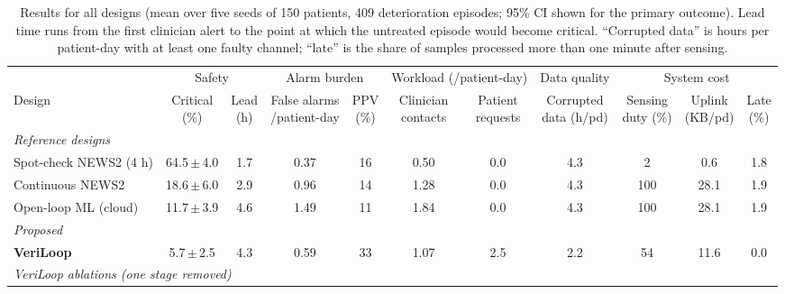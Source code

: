\documentclass[journal]{IEEEtran}
\begin{document}
\begin{table}[t]
\centering
\caption{Results for all designs (mean over five seeds of 150 patients, 409 deterioration episodes; 95\% CI shown for the
primary outcome). Lead time runs from the first clinician alert to the point at which the untreated episode would become
critical. ``Corrupted data'' is hours per patient-day with at least one faulty channel; ``late'' is the share of samples
processed more than one minute after sensing.}
\label{tab:results}
\footnotesize\setlength{\tabcolsep}{3.6pt}
\begin{tabular}{lcccccccccc}
\toprule
 & \multicolumn{2}{c}{Safety} & \multicolumn{2}{c}{Alarm burden} & \multicolumn{2}{c}{Workload (/patient-day)} &
 Data quality & \multicolumn{3}{c}{System cost} \\
\cmidrule(lr){2-3}\cmidrule(lr){4-5}\cmidrule(lr){6-7}\cmidrule(lr){8-8}\cmidrule(lr){9-11}
Design & \shortstack{Critical\\(\%)} & \shortstack{Lead\\(h)} & \shortstack{False alarms\\/patient-day} &
\shortstack{PPV\\(\%)} & \shortstack{Clinician\\contacts} & \shortstack{Patient\\requests} &
\shortstack{Corrupted\\data (h/pd)} & \shortstack{Sensing\\duty (\%)} & \shortstack{Uplink\\(KB/pd)} &
\shortstack{Late\\(\%)} \\
\midrule
\multicolumn{11}{l}{\textit{Reference designs}} \\
Spot-check NEWS2 (4 h) & 64.5\,$\pm$\,4.0 & 1.7 & 0.37 & 16 & 0.50 & 0.0 & 4.3 & 2 & 0.6 & 1.8 \\
Continuous NEWS2 & 18.6\,$\pm$\,6.0 & 2.9 & 0.96 & 14 & 1.28 & 0.0 & 4.3 & 100 & 28.1 & 1.9 \\
Open-loop ML (cloud) & 11.7\,$\pm$\,3.9 & 4.6 & 1.49 & 11 & 1.84 & 0.0 & 4.3 & 100 & 28.1 & 1.9 \\
\midrule
\multicolumn{11}{l}{\textit{Proposed}} \\
\textbf{VeriLoop} & 5.7\,$\pm$\,2.5 & 4.3 & 0.59 & 33 & 1.07 & 2.5 & 2.2 & 54 & 11.6 & 0.0 \\
\midrule
\multicolumn{11}{l}{\textit{VeriLoop ablations (one stage removed)}} \\

\end{tabular}
\end{table}
\end{document}
